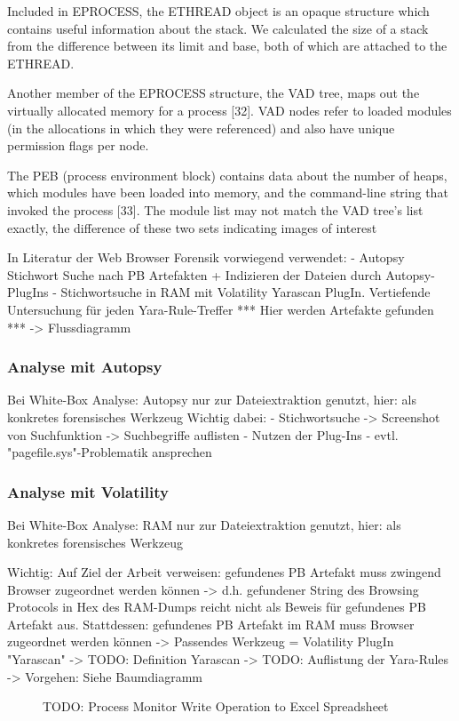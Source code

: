 	Included in EPROCESS, the ETHREAD object is an opaque structure which contains useful information about the stack. We calculated the size of a stack from the difference between its limit and base, both of which are attached to the ETHREAD.
	
	Another member of the EPROCESS structure, the VAD tree, maps out the virtually allocated memory for a process [32]. VAD nodes refer to loaded modules (in the allocations in which they were referenced) and also have unique permission flags per node.
	
	The PEB (process environment block) contains data about the number of heaps, which modules have been loaded into memory, and the command-line string that invoked the process [33]. The module list may not match the VAD tree’s list
	exactly, the difference of these two sets indicating images of interest


In Literatur der Web Browser Forensik vorwiegend verwendet: 
- Autopsy Stichwort Suche nach PB Artefakten + Indizieren der Dateien durch Autopsy-PlugIns
- Stichwortsuche in RAM mit Volatility Yarascan PlugIn. Vertiefende Untersuchung für jeden Yara-Rule-Treffer *** Hier werden Artefakte gefunden *** -> Flussdiagramm

\subsubsection*{Analyse mit Autopsy}
Bei White-Box Analyse: Autopsy nur zur Dateiextraktion genutzt, hier: als konkretes forensisches Werkzeug
Wichtig dabei:
- Stichwortsuche 
	-> Screenshot von Suchfunktion
	-> Suchbegriffe auflisten 
- Nutzen der Plug-Ins
- evtl. "pagefile.sys"-Problematik ansprechen


\subsubsection*{Analyse mit Volatility}
Bei White-Box Analyse: RAM nur zur Dateiextraktion genutzt, hier: als konkretes forensisches Werkzeug

Wichtig: Auf Ziel der Arbeit verweisen: gefundenes PB Artefakt muss zwingend Browser zugeordnet werden können -> d.h. gefundener String des Browsing Protocols in Hex des RAM-Dumps reicht nicht als Beweis für gefundenes PB Artefakt aus.
Stattdessen: gefundenes PB Artefakt im RAM muss Browser zugeordnet werden können -> Passendes Werkzeug = Volatility PlugIn "Yarascan" 
-> TODO: Definition Yarascan
-> TODO: Auflistung der Yara-Rules
-> Vorgehen: Siehe Baumdiagramm
\begin{figure}[h!]
	\centering
	\small
	\centerline{\resizebox{\linewidth}{!}{}}
	\caption{TODO: Process Monitor Write Operation to Excel Spreadsheet}
	\label{fig:jes}
\end{figure}





